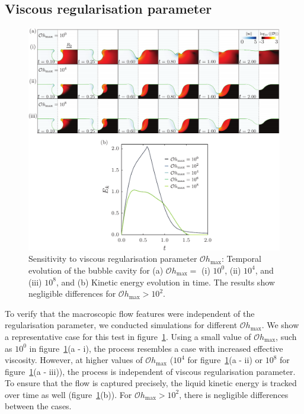 \documentclass[final]{jfm}
\begin{document}
\subsection{Viscous regularisation parameter}\label{App::OhMax}
\begin{figure}
	\centerline{\includegraphics[width=\linewidth]{FigureE1-eps-converted-to.pdf}}%
	\caption{Sensitivity to viscous regularisation parameter $\mathcal{O}h_{\text{max}}$: Temporal evolution of the bubble cavity for (a) $\mathcal{O}h_{\text{max}} =$ (i) $10^0$, (ii) $10^4$, and (iii) $10^8$, and (b) Kinetic energy evolution in time. The results show negligible differences for $\mathcal{O}h_{\text{max}} > 10^2$.}
	\label{fig:OhMax}
\end{figure}
To verify that the macroscopic flow features were independent of the regularisation parameter, we conducted simulations for different $\mathcal{O}h_\text{max}$. We show a representative case for this test in figure~\ref{fig:OhMax}. Using a small value of $\mathcal{O}h_\text{max}$, such as $10^0$ in figure~\ref{fig:OhMax}(a - i), the process resembles a case with increased effective viscosity. However, at higher values of $\mathcal{O}h_\text{max}$ ($10^4$ for figure~\ref{fig:OhMax}(a - ii) or $10^8$ for figure~\ref{fig:OhMax}(a - iii)), the process is independent of viscous regularisation parameter. To ensure that the flow is captured precisely, the liquid kinetic energy is tracked over time as well (figure~\ref{fig:OhMax}(b)). For $\mathcal{O}h_{\text{max}} > 10^2$, there is negligible differences between the cases. 
\end{document}

